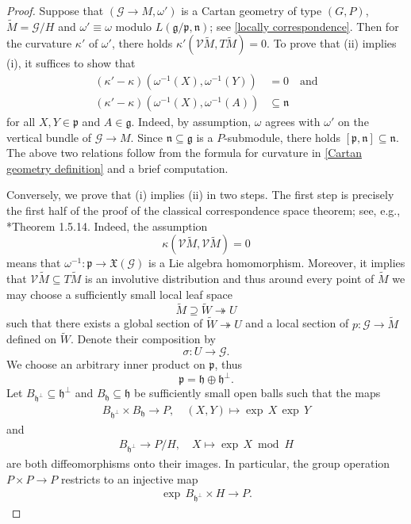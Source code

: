 \documentclass[11pt]{amsart}
\begin{document}
\begin{proof}
Suppose that $(\mathcal G\to M,\omega')$ is a Cartan geometry of type $(G,P)$, $\tilde M=\mathcal G/H$ and $\omega'\equiv\omega$ modulo $L(\mathfrak g/\mathfrak p,\mathfrak n)$; see \cref{locally correspondence}. Then for the curvature $\kappa'$ of $\omega'$, there holds $\kappa'(\mathcal V\tilde M,T\tilde M)=0$. To prove that (ii) implies (i), it suffices to show that
\begin{align*}
    (\kappa'-\kappa)(\omega^{-1}(X),\omega^{-1}(Y))&=0\quad\text{and}\\
    (\kappa'-\kappa)(\omega^{-1}(X),\omega^{-1}(A))&\subseteq\mathfrak n
\end{align*}
for all $X,Y\in\mathfrak p$ and $A\in\mathfrak g$. Indeed, by assumption, $\omega$ agrees with $\omega'$ on the vertical bundle of $\mathcal G\to M$. Since $\mathfrak n\subseteq\mathfrak g$ is a $P$-submodule, there holds $[\mathfrak p,\mathfrak n]\subseteq\mathfrak n$. The above two relations follow from the formula for curvature in \cref{Cartan geometry definition} and a brief computation.

Conversely, we prove that (i) implies (ii) in two steps. The first step is precisely the first half of the proof of the classical correspondence space theorem; see, e.g., \cite{Book}*{Theorem 1.5.14}. Indeed, the assumption
\[\kappa(\mathcal V\tilde M,\mathcal V\tilde M)=0\]
means that $\omega^{-1}:\mathfrak p\to\mathfrak X(\mathcal G)$ is a Lie algebra homomorphism. Moreover, it implies that $\mathcal V\tilde M\subseteq T\tilde M$ is an involutive distribution and thus around every point of $\tilde M$ we may choose a sufficiently small local leaf space 
\[\tilde M\supseteq\tilde W\twoheadrightarrow U\]
such that there exists a global section of $\tilde W\twoheadrightarrow U$ and a local section of $p:\mathcal G\to\tilde M$ defined on $\tilde W$. Denote their composition by 
\[\sigma:U\to\mathcal G.\]
We choose an arbitrary inner product on $\mathfrak p$, thus 
\[\mathfrak p=\mathfrak h\oplus\mathfrak h^\perp.\]
Let $B_{\mathfrak h^\perp}\subseteq\mathfrak h^\perp$ and $B_{\mathfrak h}\subseteq\mathfrak h$ be sufficiently small open balls such that the maps
\begin{align*}
        B_{\mathfrak h^\perp}\times B_{\mathfrak h}\to P,\quad
        (X,Y)\mapsto\exp\,X\,\exp\,Y
\end{align*}
and
\begin{align*}
    B_{\mathfrak h^\perp}\to P/H,\quad X\mapsto\exp\,X \bmod H
\end{align*}
are both diffeomorphisms onto their images. In particular, the group operation $P\times P\to P$ restricts to an injective map
\begin{align}\label{injective group operation}
\exp\,B_{\mathfrak h^\perp}\times H\to P.    
\end{align}


\end{proof}
\end{document}
